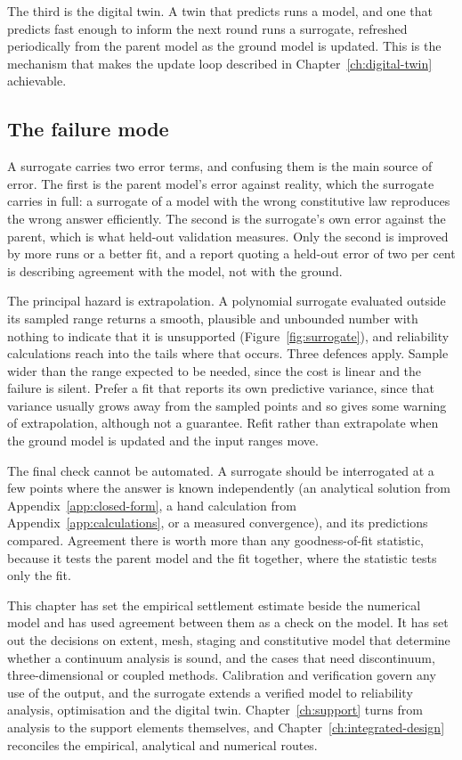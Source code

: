 The third is the digital twin. A twin that predicts runs a model, and one
that predicts fast enough to inform the next round runs a surrogate,
refreshed periodically from the parent model as the ground model is updated.
This is the mechanism that makes the update loop described in
Chapter~\ref{ch:digital-twin} achievable.

\subsection{The failure mode}
\label{sec:surrogate-failure}

A surrogate carries two error terms, and confusing them is the main source of
error. The first is the parent model's error against reality, which the
surrogate carries in full: a surrogate of a model with the wrong constitutive
law reproduces the wrong answer efficiently. The second is the surrogate's own
error against the parent, which is what held-out validation measures. Only the
second is improved by more runs or a better fit, and a report quoting a
held-out error of two per cent is describing agreement with the model, not
with the ground.

The principal hazard is extrapolation. A polynomial surrogate
evaluated outside its sampled range returns a smooth, plausible and unbounded
number with nothing to indicate that it is unsupported
(Figure~\ref{fig:surrogate}), and reliability
calculations reach into the tails where that occurs. Three defences
apply. Sample wider than the range expected to be needed, since the cost is
linear and the failure is silent. Prefer a fit that reports its own predictive
variance, since that variance usually grows away from the sampled points and
so gives some warning of extrapolation, although not a guarantee. Refit rather than
extrapolate when the ground model is updated and the input ranges move.

The final check cannot be automated. A surrogate should be
interrogated at a few points where the answer is known independently (an
analytical solution from Appendix~\ref{app:closed-form}, a hand calculation
from Appendix~\ref{app:calculations}, or a measured convergence), and its
predictions compared. Agreement there is worth more than any goodness-of-fit
statistic, because it tests the parent model and the fit together, where the statistic
tests only the fit.

\bigskip
\noindent This chapter has set the empirical settlement estimate beside the
numerical model and has used agreement between them as a check on the model.
It has set out the decisions on extent, mesh, staging and constitutive model
that determine whether a continuum analysis is sound, and the cases that need
discontinuum, three-dimensional or coupled methods. Calibration and
verification govern any use of the output, and the surrogate extends a
verified model to reliability analysis, optimisation and the digital twin.
Chapter~\ref{ch:support} turns from analysis to the support elements
themselves, and Chapter~\ref{ch:integrated-design} reconciles the empirical,
analytical and numerical routes.

\chapterreferences
